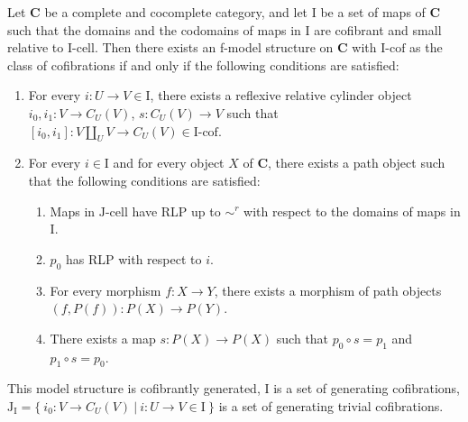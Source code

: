 \documentclass{amsart}
\theoremstyle{definition}
\newcommand{\cat}[1]{\mathbf{#1}}
\newcommand{\C}{\cat{C}}
\newcommand{\I}{\mathrm{I}}
\newcommand{\J}{\mathrm{J}}
\newcommand{\class}[2]{#1\text{-}\mathrm{#2}}
\newcommand{\Icell}[1][\I]{\class{#1}{cell}}
\newcommand{\Icof}[1][\I]{\class{#1}{cof}}
\newcommand{\Jcell}[1][]{\Icell[\J#1]}
\newcommand{\cyli}{i}
\begin{document}
\begin{thm}
Let $\C$ be a complete and cocomplete category, and let $\I$ be a set of maps of $\C$
such that the domains and the codomains of maps in $\I$ are cofibrant and small relative to $\Icell$.
Then there exists an f-model structure on $\C$ with $\Icof$ as the class of cofibrations if and only if the following conditions are satisfied:
\begin{enumerate}
\item For every $i : U \to V \in \I$, there exists a reflexive relative cylinder object $\cyli_0,\cyli_1 : V \to C_U(V)$, $s : C_U(V) \to V$
such that $[\cyli_0,\cyli_1] : V \amalg_U V \to C_U(V) \in \Icof$.
\item For every $i \in \I$ and for every object $X$ of $\C$, there exists a path object such that the following conditions are satisfied:
\begin{enumerate}
\item Maps in $\Jcell$ have RLP up to $\sim^r$ with respect to the domains of maps in $\I$.
\item $p_0$ has RLP with respect to $i$.
\item For every morphism $f : X \to Y$, there exists a morphism of path objects $(f,P(f)) : P(X) \to P(Y)$.
\item There exists a map $s : P(X) \to P(X)$ such that $p_0 \circ s = p_1$ and $p_1 \circ s = p_0$.
\end{enumerate}
\end{enumerate}
This model structure is cofibrantly generated, $\I$ is a set of generating cofibrations,
$\J_\I = \{\ \cyli_0 : V \to C_U(V)\ |\ i : U \to V \in \I \ \}$ is a set of generating trivial cofibrations.
\end{thm}
\end{document}
